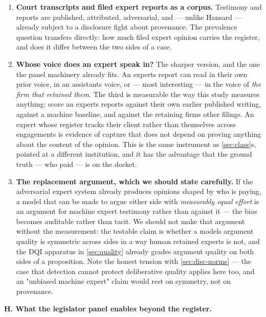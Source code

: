 \begin{enumerate}
\def\labelenumi{\arabic{enumi}.}
\setcounter{enumi}{32}
\item
  \textbf{Court transcripts and filed expert reports as a corpus.} Testimony and
  reports are published, attributed, adversarial, and --- unlike Hansard ---
  already subject to a disclosure fight about provenance. The prevalence
  question transfers directly: how much filed expert opinion carries the
  register, and does it differ between the two sides of a case.
\item
  \textbf{Whose voice does an expert speak in?} The sharper version, and the one
  the panel machinery already fits. An expert\textquotesingle s report can read in their own
  prior voice, in an assistant\textquotesingle s voice, or --- most interesting --- in the voice
  of \emph{the firm that retained them}. The third is measurable the way this study
  measures anything: score an expert\textquotesingle s reports against their own earlier
  published writing, against a machine baseline, and against the retaining
  firm\textquotesingle s other filings. An expert whose register tracks their client rather
  than themselves across engagements is evidence of capture that does not
  depend on proving anything about the content of the opinion. This is the
  same instrument as \cref{sec:class}\textquotesingle s, pointed at a different institution, and it has
  the advantage that the ground truth --- who paid --- is on the docket.
\item
  \textbf{The replacement argument, which we should state carefully.} If the
  adversarial expert system already produces opinions shaped by who is paying,
  a model that can be made to argue either side with \emph{measurably equal effort}
  is an argument for machine expert testimony rather than against it --- the
  bias becomes auditable rather than tacit. We should not make that argument
  without the measurement: the testable claim is whether a model\textquotesingle s argument
  quality is symmetric across sides in a way human retained experts\textquotesingle{} is not,
  and the DQI apparatus in \cref{sec:quality} already grades argument quality on both sides
  of a proposition. Note the honest tension with \cref{sec:disc-norms} --- the case that
  detection cannot protect deliberative quality applies here too, and an
  "unbiased machine expert" claim would rest on symmetry, not on provenance.
\end{enumerate}

\textbf{H. What the legislator panel enables beyond the register.}

